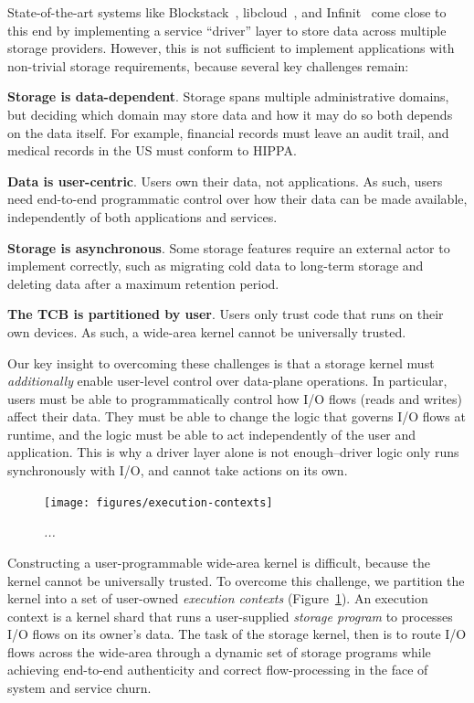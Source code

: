 State-of-the-art systems like Blockstack~\cite{blockstack},
libcloud~\cite{libcloud}, and Infinit~\cite{infinite} come close to this
end by implementing a service ``driver'' layer to
store data across multiple storage providers.  However, this is not
sufficient to implement applications with non-trivial storage requirements,
because several key challenges remain:

\textbf{Storage is data-dependent}. Storage spans multiple
administrative domains, but deciding which domain may store data and how it may
do so both depends on the data itself. For example, financial records must leave
an audit trail, and medical records in the US must conform to HIPPA.

\textbf{Data is user-centric}. Users own their data, not applications.
As such, users need end-to-end programmatic control over how their data
can be made available, independently of both applications and services.

\textbf{Storage is asynchronous}. Some storage features require an external
actor to implement correctly, such as migrating cold data to long-term storage
and deleting data after a maximum retention period.

\textbf{The TCB is partitioned by user}.  Users only trust code that runs on their own
devices.  As such, a wide-area kernel cannot be universally trusted.

Our key insight to overcoming these challenges is that a storage kernel
must \textit{additionally} enable user-level control over data-plane operations.
In particular, users must be able to programmatically
control how I/O flows (reads and writes) affect their data.  They must be able to change the
logic that governs I/O flows at runtime, and the logic must be able to
act independently of the user and application.  This is why a driver layer alone is
not enough--driver logic only runs synchronously with I/O, and cannot take
actions on its own.

\begin{figure}[t!]
\centering
\texttt{[image: figures/execution-contexts]}
\caption{\it...}
\label{fig:execution-contexts}
\end{figure}

Constructing a user-programmable wide-area kernel is difficult, because the kernel cannot be
universally trusted.  To overcome this challenge, we partition the kernel into a
set of user-owned \textit{execution contexts}
(Figure~\ref{fig:execution-contexts}).  An execution context is a
kernel shard that runs a user-supplied \textit{storage program} to processes I/O
flows on its owner's data.  The task of the storage kernel, then is to 
route I/O flows across the wide-area 
through a dynamic set of storage programs
while achieving end-to-end authenticity and correct flow-processing in the face
of system and service churn.

